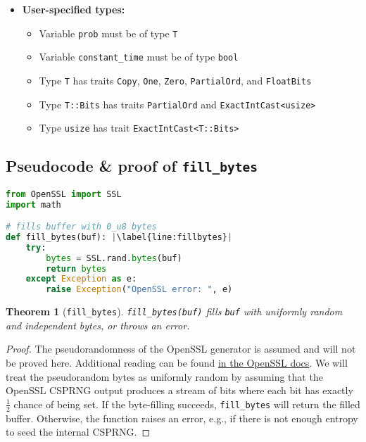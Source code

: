 \documentclass[11pt,a4paper]{article}
\newtheorem{theorem}{Theorem}[section]
\theoremstyle{definition}
\begin{document}
\begin{itemize}
    \item \textbf{User-specified types:}
    \begin{itemize}
        \item Variable \texttt{prob} must be of type \texttt{T}
        \item Variable \texttt{constant\_time} must be of type \texttt{bool}
        \item Type \texttt{T} has traits \texttt{Copy}, \texttt{One}, \texttt{Zero}, \texttt{PartialOrd}, and \texttt{FloatBits}
        \item Type \texttt{T::Bits} has traits \texttt{PartialOrd} and \texttt{ExactIntCast<usize>}
        \item Type \texttt{usize} has trait \texttt{ExactIntCast<T::Bits>}
    \end{itemize}
\end{itemize}

\subsection{Pseudocode \& proof of \texttt{fill\_bytes}}
\begin{lstlisting}[language=Python, escapechar=|]
from OpenSSL import SSL
import math

# fills buffer with 0_u8 bytes
def fill_bytes(buf): |\label{line:fillbytes}|
    try:
        bytes = SSL.rand.bytes(buf)
        return bytes 
    except Exception as e:
        raise Exception("OpenSSL error: ", e)
\end{lstlisting}

\begin{tcolorbox}
\begin{theorem}[\texttt{fill\_bytes}]
\texttt{fill\_bytes(buf)} fills \texttt{buf} with uniformly random and independent bytes, or throws an error. 
\end{theorem}
\end{tcolorbox}

\begin{proof}
The pseudorandomness of the OpenSSL generator is assumed and will not be proved here. Additional reading can be found \href{https://www.openssl.org/docs/man1.1.1/man3/RAND_bytes.html}{in the OpenSSL docs}. We will treat the pseudorandom bytes as uniformly random by assuming that the OpenSSL CSPRNG output produces a stream of bits where each bit has exactly $\frac{1}{2}$ chance of being set. If the byte-filling succeeds, \texttt{fill\_bytes} will return the filled buffer. Otherwise, the function raises an error, e.g., if there is not enough entropy to seed the internal CSPRNG.  
\end{proof}
\end{document}
